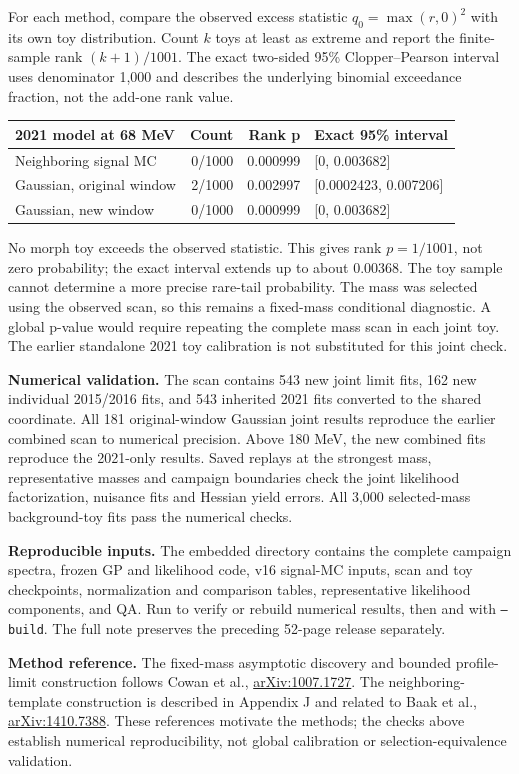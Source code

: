 \documentclass[11pt]{article}
\begin{document}
For each method, compare the observed excess statistic $q_0=\max(r,0)^2$ with its own toy distribution. Count $k$ toys at least as extreme and report the finite-sample rank $(k+1)/1001$. The exact two-sided 95\% Clopper--Pearson interval uses denominator 1,000 and describes the underlying binomial exceedance fraction, not the add-one rank value.
\begin{center}\small\begin{tabular}{lrrl}\toprule
2021 model at 68 MeV & Count & Rank p & Exact 95\% interval\\\midrule
Neighboring signal MC & 0/1000 & 0.000999 & [0, 0.003682]\\
Gaussian, original window & 2/1000 & 0.002997 & [0.0002423, 0.007206]\\
Gaussian, new window & 0/1000 & 0.000999 & [0, 0.003682]\\
\bottomrule\end{tabular}\end{center}
No morph toy exceeds the observed statistic. This gives rank $p=1/1001$, not zero probability; the exact interval extends up to about 0.00368. The toy sample cannot determine a more precise rare-tail probability. The mass was selected using the observed scan, so this remains a fixed-mass conditional diagnostic. A global p-value would require repeating the complete mass scan in each joint toy. The earlier standalone 2021 toy calibration is not substituted for this joint check.

\textbf{Numerical validation.} The scan contains 543 new joint limit fits, 162 new individual 2015/2016 fits, and 543 inherited 2021 fits converted to the shared coordinate. All 181 original-window Gaussian joint results reproduce the earlier combined scan to numerical precision. Above 180 MeV, the new combined fits reproduce the 2021-only results. Saved replays at the strongest mass, representative masses and campaign boundaries check the joint likelihood factorization, nuisance fits and Hessian yield errors. All 3,000 selected-mass background-toy fits pass the numerical checks.

\textbf{Reproducible inputs.} The embedded  directory contains the complete campaign spectra, frozen GP and likelihood code, v16 signal-MC inputs, scan and toy checkpoints, normalization and comparison tables, representative likelihood components, and QA. Run  to verify or rebuild numerical results, then  and  with \texttt{--build}. The full note preserves the preceding 52-page release separately.

\textbf{Method reference.} The fixed-mass asymptotic discovery and bounded profile-limit construction follows Cowan et al., \href{https://arxiv.org/abs/1007.1727}{arXiv:1007.1727}. The neighboring-template construction is described in Appendix J and related to Baak et al., \href{https://arxiv.org/abs/1410.7388}{arXiv:1410.7388}. These references motivate the methods; the checks above establish numerical reproducibility, not global calibration or selection-equivalence validation.
\end{document}
